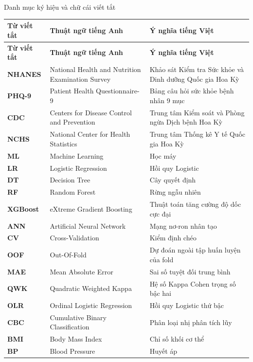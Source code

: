 \documentclass{uetgraduation}
\begin{document}
\begin{contentlisting}
\begin{contentlistingsection}{Danh mục ký hiệu và chữ cái viết tắt}
\setlength{\tabcolsep}{4pt}
\begin{longtable}{p{2.0cm} p{6.4cm} p{6.4cm}}
\toprule
\textbf{Từ viết tắt} & \textbf{Thuật ngữ tiếng Anh} & \textbf{Ý nghĩa tiếng Việt} \\
\midrule
\endfirsthead
\toprule
\textbf{Từ viết tắt} & \textbf{Thuật ngữ tiếng Anh} & \textbf{Ý nghĩa tiếng Việt} \\
\midrule
\endhead
\bottomrule
\endfoot
\textbf{NHANES} & National Health and Nutrition Examination Survey & Khảo sát Kiểm tra Sức khỏe và Dinh dưỡng Quốc gia Hoa Kỳ \\
\textbf{PHQ-9}  & Patient Health Questionnaire-9 & Bảng câu hỏi sức khỏe bệnh nhân 9 mục \\
\textbf{CDC}    & Centers for Disease Control and Prevention & Trung tâm Kiểm soát và Phòng ngừa Dịch bệnh Hoa Kỳ \\
\textbf{NCHS}   & National Center for Health Statistics & Trung tâm Thống kê Y tế Quốc gia Hoa Kỳ \\
\textbf{ML}     & Machine Learning & Học máy \\
\textbf{LR}     & Logistic Regression & Hồi quy Logistic \\
\textbf{DT}     & Decision Tree & Cây quyết định \\
\textbf{RF}     & Random Forest & Rừng ngẫu nhiên \\
\textbf{XGBoost}& eXtreme Gradient Boosting & Thuật toán tăng cường độ dốc cực đại \\
\textbf{ANN}    & Artificial Neural Network & Mạng nơ-ron nhân tạo \\
\textbf{CV}     & Cross-Validation & Kiểm định chéo \\
\textbf{OOF}    & Out-Of-Fold & Dự đoán ngoài tập huấn luyện của fold \\
\textbf{MAE}    & Mean Absolute Error & Sai số tuyệt đối trung bình \\
\textbf{QWK}    & Quadratic Weighted Kappa & Hệ số Kappa Cohen trọng số bậc hai \\
\textbf{OLR}    & Ordinal Logistic Regression & Hồi quy Logistic thứ bậc \\
\textbf{CBC}    & Cumulative Binary Classification & Phân loại nhị phân tích lũy \\
\textbf{BMI}    & Body Mass Index & Chỉ số khối cơ thể \\
\textbf{BP}     & Blood Pressure & Huyết áp \\

\end{longtable}
\end{contentlistingsection}
\end{contentlisting}
\end{document}
